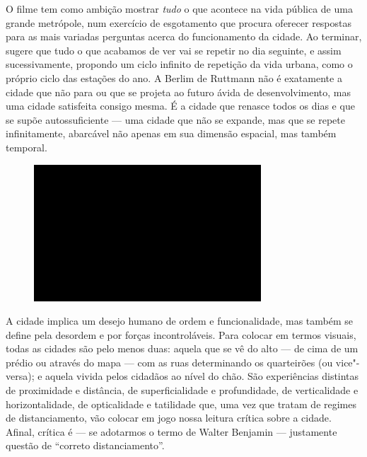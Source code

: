 O filme tem como ambição mostrar \emph{tudo} o que acontece na vida
pública de uma grande metrópole, num exercício de esgotamento que
procura oferecer respostas para as mais variadas perguntas acerca do
funcionamento da cidade. Ao terminar, sugere que tudo o que acabamos de
ver vai se repetir no dia seguinte, e assim sucessivamente, propondo um
ciclo infinito de repetição da vida urbana, como o próprio ciclo das
estações do ano. A Berlim de Ruttmann não é exatamente a cidade que não
para ou que se projeta ao futuro ávida de desenvolvimento, mas uma
cidade satisfeita consigo mesma. É a cidade que renasce todos os dias e
que se supõe autossuficiente --- uma cidade que não se expande, mas que
se repete infinitamente, abarcável não apenas em sua dimensão espacial,
mas também temporal.

\begin{figure}[!ht]

\centering
 \includegraphics[width=85mm]{./imgs/im1.jpg}
\caption{\tiny{}}

\end{figure}

A cidade implica um desejo humano de ordem e funcionalidade, mas também
se define pela desordem e por forças incontroláveis. Para colocar em
termos visuais, todas as cidades são pelo menos duas: aquela que se vê
do alto --- de cima de um prédio ou através do mapa --- com as ruas
determinando os quarteirões (ou vice"-versa); e aquela vivida pelos
cidadãos ao nível do chão. São experiências distintas de proximidade e
distância, de superficialidade e profundidade, de verticalidade e
horizontalidade, de opticalidade e tatilidade que, uma vez que tratam de
regimes de distanciamento, vão colocar em jogo nossa leitura crítica
sobre a cidade. Afinal, crítica é --- se adotarmos o termo de Walter
Benjamin --- justamente questão de ``correto distanciamento''.

